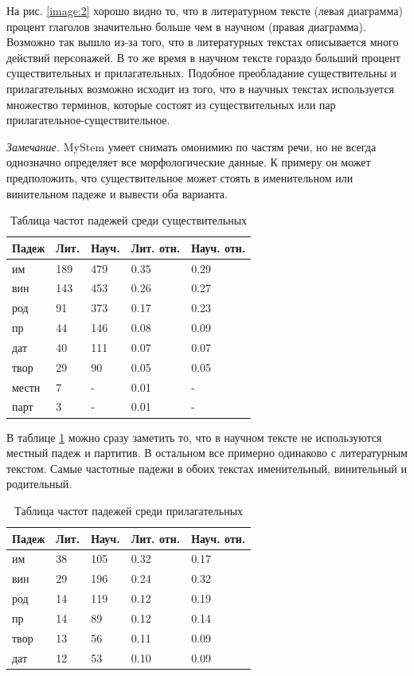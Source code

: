 \documentclass[12pt]{article}
\begin{document}
На рис. \ref{image:2} хорошо видно то, что в литературном тексте (левая диаграмма) процент глаголов значительно больше чем в научном (правая диаграмма). Возможно так вышло из-за того, что в литературных текстах описывается много действий персонажей. В то же время в научном тексте гораздо больший процент существительных и прилагательных. Подобное преобладание существительны и прилагательных возможно исходит из того, что в научных текстах используется множество терминов, которые состоят из существительных или пар прилагательное-существительное.

\textit{Замечание.} MyStem умеет снимать омонимию по частям речи, но не всегда однозначно определяет все морфологические данные. К примеру он может предположить, что существительное может стоять в именительном или винительном падеже и вывести оба варианта.

\begin{table}[h!]
\centering
\begin{tabular}{ |p{3cm}||p{2cm}|p{2cm}|p{2cm}|p{2cm}| }
 \hline
 Падеж& Лит. &Науч. &Лит. отн. &Науч. отн.\\
 \hline
 им & 189 & 479 & 0.35 & 0.29\\
 вин & 143 & 453 & 0.26 & 0.27\\
 род & 91 & 373 & 0.17 & 0.23 \\
 пр & 44 & 146 & 0.08 & 0.09 \\
 дат & 40 & 111 & 0.07 & 0.07 \\
 твор & 29 & 90 & 0.05 & 0.05 \\
 местн & 7 & - & 0.01 & - \\
 парт & 3 & - & 0.01 & - \\
 \hline
\end{tabular}
\caption{Таблица частот падежей среди существительных}
\label{table:4}
\end{table}

В таблице \ref{table:4} можно сразу заметить то, что в научном тексте не используются местный падеж и партитив. В остальном все примерно одинаково с литературным текстом. Самые частотные падежи в обоих текстах именительный, винительный и родительный.

\begin{table}[h!]
\centering
\begin{tabular}{ |p{3cm}||p{2cm}|p{2cm}|p{2cm}|p{2cm}| }
 \hline
 Падеж& Лит. &Науч. &Лит. отн. &Науч. отн.\\
 \hline
 им & 38 & 105 & 0.32 & 0.17\\
 вин & 29 & 196 & 0.24 & 0.32\\
 род & 14 & 119 & 0.12 & 0.19 \\
 пр & 14 & 89 & 0.12 & 0.14 \\
 твор & 13 & 56 & 0.11 & 0.09 \\
 дат & 12 & 53 & 0.10 & 0.09 \\
 \hline
\end{tabular}
\caption{Таблица частот падежей среди прилагательных}
\label{table:5}
\end{table}
\end{document}
